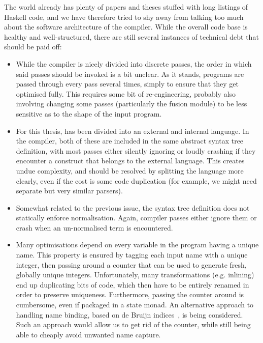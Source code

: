 The world already has plenty of papers and theses stuffed with long
listings of Haskell code, and we have therefore tried to shy away from
talking too much about the software architecture of the \LO{}
compiler.  While the overall code base is healthy and well-structured,
there are still several instances of technical debt that should be
paid off:

\begin{itemize}
\item While the compiler is nicely divided into discrete passes, the
  order in which said passes should be invoked is a bit unclear.  As
  it stands, programs are passed through every pass several times,
  simply to ensure that they get optimised fully.  This requires some
  bit of re-engineering, probably also involving changing some passes
  (particularly the fusion module) to be less sensitive as to the
  shape of the input program.

\item For this thesis, \LO{} has been divided into an external and
  internal language.  In the compiler, both of these are included in
  the same abstract syntax tree definition, with most passes either
  silently ignoring or loudly crashing if they encounter a construct
  that belongs to the external language.  This creates undue
  complexity, and should be resolved by splitting the language more
  clearly, even if the cost is some code duplication (for example, we
  might need separate but very similar parsers).

\item Somewhat related to the previous issue, the \LO{} syntax tree
  definition does not statically enforce normalisation.  Again,
  compiler passes either ignore them or crash when an un-normalised
  term is encountered.

\item Many optimisations depend on every variable in the program
  having a unique name.  This property is ensured by tagging each
  input name with a unique integer, then passing around a counter that
  can be used to generate fresh, globally unique integers.
  Unfortunately, many transformations (e.g. inlining) end up
  duplicating bits of code, which then have to be entirely renamed in
  order to preserve uniqueness.  Furthermore, passing the counter
  around is cumbersome, even if packaged in a state monad.  An
  alternative approach to handling name binding, based on de Bruijn
  indices~\cite{McBride:2004:FPI:1017472.1017477}, is being
  considered.  Such an approach would allow us to get rid of the
  counter, while still being able to cheaply avoid unwanted name
  capture.
\end{itemize}

